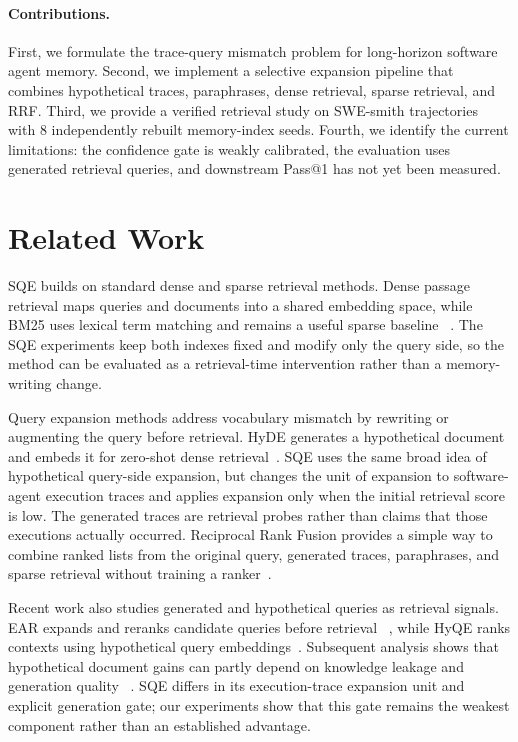 \documentclass[10pt]{article}
\begin{document}
\paragraph{Contributions.}
First, we formulate the trace-query mismatch problem for long-horizon software
agent memory. Second, we implement a selective expansion pipeline that combines
hypothetical traces, paraphrases, dense retrieval, sparse retrieval, and RRF.
Third, we provide a verified retrieval study on SWE-smith trajectories~\cite{yang2025swesmith} with
8 independently rebuilt memory-index seeds. Fourth, we identify the current
limitations: the confidence gate is weakly calibrated, the evaluation uses
generated retrieval queries, and downstream Pass@1 has not yet been measured.

\section{Related Work}
SQE builds on standard dense and sparse retrieval methods. Dense passage
retrieval maps queries and documents into a shared embedding space, while BM25
uses lexical term matching and remains a useful sparse baseline
~\cite{karpukhin2020dpr,robertson2009bm25}. The SQE experiments keep both
indexes fixed and modify only the query side, so the method can be evaluated as
a retrieval-time intervention rather than a memory-writing change.

Query expansion methods address vocabulary mismatch by rewriting or augmenting
the query before retrieval. HyDE generates a hypothetical document and embeds it
for zero-shot dense retrieval~\cite{gao2023hyde}. SQE uses the same broad idea
of hypothetical query-side expansion, but changes the unit of expansion to
software-agent execution traces and applies expansion only when the initial
retrieval score is low. The generated traces are retrieval probes rather than
claims that those executions actually occurred. Reciprocal Rank Fusion provides
a simple way to combine ranked lists from
the original query, generated traces, paraphrases, and sparse retrieval without
training a ranker~\cite{cormack2009rrf}.

Recent work also studies generated and hypothetical queries as retrieval
signals. EAR expands and reranks candidate queries before retrieval
~\cite{chuang2023ear}, while HyQE ranks contexts using hypothetical query
embeddings~\cite{zhou2024hyqe}. Subsequent analysis shows that hypothetical
document gains can partly depend on knowledge leakage and generation quality
~\cite{yoon2025hypothetical}. SQE differs in its execution-trace expansion unit
and explicit generation gate; our experiments show that this gate remains the
weakest component rather than an established advantage.
\end{document}
